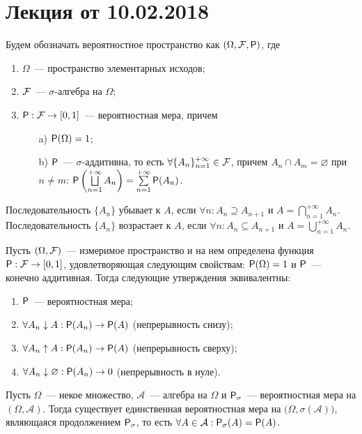 \section{Лекция от 10.02.2018}
Будем обозначать вероятностное пространство как $(\Omega,  \F, \P)$, где 
\begin{enumerate}
	\item $\Omega$~--- пространство элементарных исходов;
	\item $\F$~--- $\sigma$-алгебра на $\Omega$;
	\item{$\P: \F \rightarrow [0, 1]$~--- вероятностная мера, причем
		\begin{enumerate}
			\item[a)] $\P (\Omega) = 1$;
			\item[b)] $\P$~--- $\sigma$-аддитивна, то есть $\forall \{A_n\}_{n = 1}^{+\infty} \in \F$, причем $A_n \cap A_m = \varnothing$ при $n \neq m$: $\P \left( \bigsqcup\limits_{n=1}^{+\infty} A_n \right) = \sum \limits_{n = 1}^{+\infty} \P (A_n)$.
		\end{enumerate}
	}
\end{enumerate}
\begin{definition}
	Последовательность $\{A_n\}$ убывает к $A$, если $\forall n: A_{n} \supseteq A_{n+1}$ и   $A = \bigcap\limits_{n = 1}^{+\infty} A_n$. Последовательность $\{A_n\}$ возрастает к $A$, если $\forall n: A_{n} \subseteq A_{n+1}$ и   $A = \bigcup\limits_{n = 1}^{+\infty} A_n$.
\end{definition}
\begin{theorem}
	Пусть $(\Omega, \F )$~--- измеримое пространство и на нем определена функция $\P : \F \rightarrow [0,1]$, удовлетворяющая следующим свойствам: $\P (\Omega) = 1$ и $\P$~--- конечно аддитивная. Тогда следующие утверждения эквивалентны:
	\begin{enumerate}
		\item $\P$~--- вероятностная мера;
		\item $\forall A_n \downarrow A: \P (A_n) \rightarrow \P(A)$ (непрерывность снизу);
		\item $\forall A_n \uparrow A: \P (A_n) \rightarrow \P(A)$ (непрерывность сверху);
		\item  $\forall A_n \downarrow \varnothing: \P (A_n) \rightarrow 0$ (непрерывность в нуле).
	\end{enumerate}
\end{theorem}
\begin{theorem}[Каратеодори][б/д]
	Пусть $\Omega$~--- некое множество, $\mathcal{A}$~--- алгебра на $\Omega$ и $\P_\sigma$~--- вероятностная мера на $(\Omega, \mathcal{A})$. Тогда существует единственная вероятностная мера на $\big(\Omega, \sigma(\mathcal{A}) \big)$, являющаяся продолжением $\P_\sigma$, то есть  $ \forall A \in \mathcal{A}: \P_\sigma(A) = \P(A)$.
\end{theorem}

